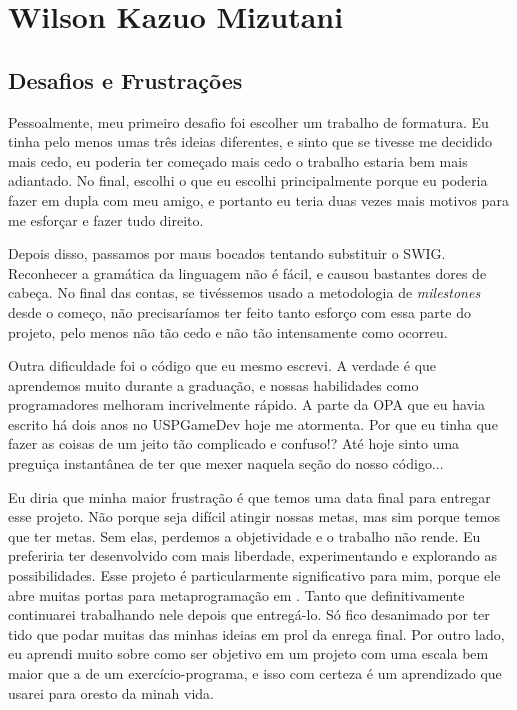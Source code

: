 \chapter{Wilson Kazuo Mizutani}
\label{cap:wil_subjetiva}

\section{Desafios e Frustrações}
\label{cap:wil:desafios_frustracoes}

Pessoalmente, meu primeiro desafio foi escolher um trabalho de formatura. Eu
tinha pelo menos umas três ideias diferentes, e sinto que se tivesse me decidido
mais cedo, eu poderia ter começado mais cedo o trabalho estaria bem mais
adiantado. No final, escolhi o que eu escolhi principalmente porque eu poderia
fazer em dupla com meu amigo, e portanto eu teria duas vezes mais motivos para
me esforçar e fazer tudo direito.

Depois disso, passamos por maus bocados tentando substituir o SWIG. Reconhecer a
gramática da linguagem \CXX{} não é fácil, e causou bastantes dores de cabeça.
No final das contas, se tivéssemos usado a metodologia de \textit{milestones}
desde o começo, não precisaríamos ter feito tanto esforço com essa parte do
projeto, pelo menos não tão cedo e não tão intensamente como ocorreu.

Outra dificuldade foi o código que eu mesmo escrevi. A verdade é que aprendemos
muito durante a graduação, e nossas habilidades como programadores melhoram
incrivelmente rápido. A parte da OPA que eu havia escrito há dois anos no
USPGameDev hoje me atormenta. Por que eu tinha que fazer as coisas de um jeito
tão complicado e confuso!? Até hoje sinto uma preguiça instantânea de ter que
mexer naquela seção do nosso código...

Eu diria que minha maior frustração é que temos uma data final para entregar
esse projeto. Não porque seja difícil atingir nossas metas, mas sim porque
temos que ter metas. Sem elas, perdemos a objetividade e o trabalho não rende.
Eu preferiria ter desenvolvido com mais liberdade, experimentando e explorando
as possibilidades. Esse projeto é particularmente significativo para mim, porque
ele abre muitas portas para metaprogramação em \CXX{}. Tanto que definitivamente
continuarei trabalhando nele depois que entregá-lo. Só fico desanimado por ter
tido que podar muitas das minhas ideias em prol da enrega final. Por outro lado,
eu aprendi muito sobre como ser objetivo em um projeto com uma escala bem maior
que a de um exercício-programa, e isso com certeza é um aprendizado que usarei
para oresto da minah vida.

